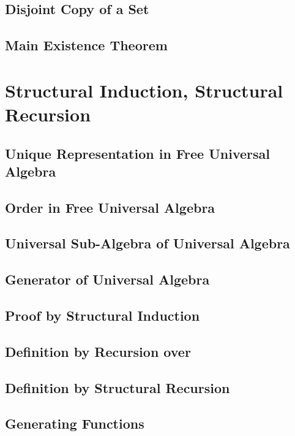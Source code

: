 \documentclass{report}
\begin{document}
    \subsection{Disjoint Copy of a Set}
      
    \subsection{Main Existence Theorem}
      
\section{Structural Induction, Structural Recursion}
    \subsection{Unique Representation in Free Universal Algebra}
      
    \subsection{Order in Free Universal Algebra}
      
    \subsection{Universal Sub-Algebra of Universal Algebra}
      
    \subsection{Generator of Universal Algebra}
      
    \subsection{Proof by Structural Induction}
      
    \subsection{Definition by Recursion over \texorpdfstring{\N}{N}}
      
    \subsection{Definition by Structural Recursion}
      
    \subsection{Generating Functions}
      
\end{document}
